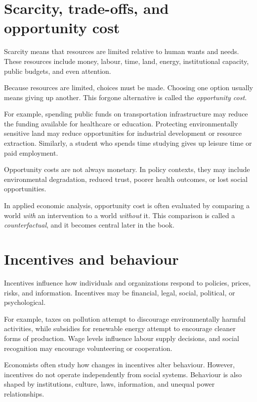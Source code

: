 \documentclass[
  11pt,
  oneside]{book}
\begin{document}
\section{Scarcity, trade-offs, and opportunity cost}\label{scarcity-trade-offs-and-opportunity-cost}

Scarcity means that resources are limited relative to human wants and needs. These resources include money, labour, time, land, energy, institutional capacity, public budgets, and even attention.

Because resources are limited, choices must be made. Choosing one option usually means giving up another. This forgone alternative is called the \emph{opportunity cost}.

For example, spending public funds on transportation infrastructure may reduce the funding available for healthcare or education. Protecting environmentally sensitive land may reduce opportunities for industrial development or resource extraction. Similarly, a student who spends time studying gives up leisure time or paid employment.

Opportunity costs are not always monetary. In policy contexts, they may include environmental degradation, reduced trust, poorer health outcomes, or lost social opportunities.

In applied economic analysis, opportunity cost is often evaluated by comparing a world \emph{with} an intervention to a world \emph{without} it. This comparison is called a \emph{counterfactual}, and it becomes central later in the book.

\section{Incentives and behaviour}\label{incentives-and-behaviour}

Incentives influence how individuals and organizations respond to policies, prices, risks, and information. Incentives may be financial, legal, social, political, or psychological.

For example, taxes on pollution attempt to discourage environmentally harmful activities, while subsidies for renewable energy attempt to encourage cleaner forms of production. Wage levels influence labour supply decisions, and social recognition may encourage volunteering or cooperation.

Economists often study how changes in incentives alter behaviour. However, incentives do not operate independently from social systems. Behaviour is also shaped by institutions, culture, laws, information, and unequal power relationships.
\end{document}
